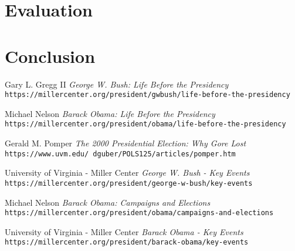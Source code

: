 \documentclass{article}
\begin{document}
\section{Evaluation}

\section{Conclusion}

\newpage

\begin{thebibliography}{10}
    Gary L. Gregg II
    \textit{George W. Bush: Life Before the Presidency}
    \texttt{https://millercenter.org/president/gwbush/life-before-the-presidency}

    Michael Nelson
    \textit{Barack Obama: Life Before the Presidency}
    \texttt{https://millercenter.org/president/obama/life-before-the-presidency}

    Gerald M. Pomper
    \textit{The 2000 Presidential Election: Why Gore Lost}
    \texttt{https://www.uvm.edu/~dguber/POLS125/articles/pomper.htm}

    University of Virginia - Miller Center
    \textit{George W. Bush - Key Events}
    \texttt{https://millercenter.org/president/george-w-bush/key-events}

    Michael Nelson
    \textit{Barack Obama: Campaigns and Elections}
    \texttt{https://millercenter.org/president/obama/campaigns-and-elections}

    University of Virginia - Miller Center
    \textit{Barack Obama - Key Events}
    \texttt{https://millercenter.org/president/barack-obama/key-events}

\end{thebibliography}
\end{document}
